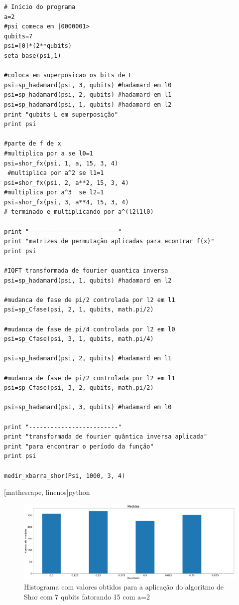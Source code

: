 \documentclass[12pt,a4paper]{article}
\begin{document}
\begin{verbatim}
# Início do programa
a=2
#psi comeca em |0000001>
qubits=7
psi=[0]*(2**qubits)
seta_base(psi,1)

#coloca em superposicao os bits de L
psi=sp_hadamard(psi, 3, qubits) #hadamard em l0 
psi=sp_hadamard(psi, 2, qubits) #hadamard em l1 
psi=sp_hadamard(psi, 1, qubits) #hadamard em l2 
print "qubits L em superposição"
print psi

#parte de f de x
#multiplica por a se l0=1
psi=shor_fx(psi, 1, a, 15, 3, 4) 
 #multiplica por a^2 se l1=1
psi=shor_fx(psi, 2, a**2, 15, 3, 4)
#multiplica por a^3  se l2=1
psi=shor_fx(psi, 3, a**4, 15, 3, 4) 
# terminado e multiplicando por a^(l2l1l0)

print "-------------------------"
print "matrizes de permutação aplicadas para econtrar f(x)"
print psi

#IQFT transformada de fourier quantica inversa
psi=sp_hadamard(psi, 1, qubits) #hadamard em l2

#mudanca de fase de pi/2 controlada por l2 em l1
psi=sp_Cfase(psi, 2, 1, qubits, math.pi/2) 

#mudanca de fase de pi/4 controlada por l2 em l0
psi=sp_Cfase(psi, 3, 1, qubits, math.pi/4) 

psi=sp_hadamard(psi, 2, qubits) #hadamard em l1

#mudanca de fase de pi/2 controlada por l2 em l1
psi=sp_Cfase(psi, 3, 2, qubits, math.pi/2) 

psi=sp_hadamard(psi, 3, qubits) #hadamard em l0 

print "-------------------------"
print "transformada de fourier quântica inversa aplicada"
print "para encontrar o período da função"
print psi

medir_xbarra_shor(Psi, 1000, 3, 4)
\end{verbatim}[mathescape, linenos]{python}


\begin{figure}
    \centering
    \includegraphics[width=1\textwidth]{relatorio-shor1.png}
    \caption{Histograma com valores obtidos para a aplicação do algoritmo de Shor com 7 qubits fatorando 15 com a=2}
    \label{fig:Shor1}
\end{figure}
\end{document}
